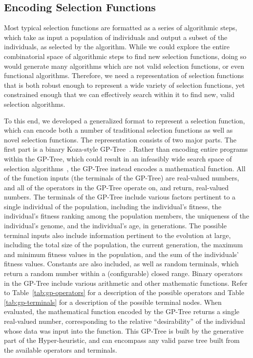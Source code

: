 \documentclass[times,12pt,titlepage]{mstogs}
\begin{document}
\begin{ThesisBody}
\section{Encoding Selection Functions}
\label{Methodology-Encoding Selection Functions}

Most typical selection functions are formatted as a series of algorithmic steps, which take as input a population of individuals and output a subset of the individuals, as selected by the algorithm. While we could explore the entire combinatorial space of algorithmic steps to find new selection functions, doing so would generate many algorithms which are not valid selection functions, or even functional algorithms. Therefore, we need a representation of selection functions that is both robust enough to represent a wide variety of selection functions, yet constrained enough that we can effectively search within it to find new, valid selection algorithms.

To this end, we developed a generalized format to represent a selection function, which can encode both a number of traditional selection functions as well as novel selection functions. The representation consists of two major parts. The first part is a binary Koza-style GP-Tree~\citep{koza1994genetic}. Rather than encoding entire programs within the GP-Tree, which could result in an infeasibly wide search space of selection algorithms~\citep{woodward2009GPNotGood}, the GP-Tree instead encodes a mathematical function. All of the function inputs (the terminals of the GP-Tree) are real-valued numbers, and all of the operators in the GP-Tree operate on, and return, real-valued numbers. The terminals of the GP-Tree include various factors pertinent to a single individual of the population, including the individual's fitness, the individual's fitness ranking among the population members, the uniqueness of the individual's genome, and the individual's age, in generations. The possible terminal inputs also include information pertinent to the evolution at large, including the total size of the population, the current generation, the maximum and minimum fitness values in the population, and the sum of the individuals' fitness values. Constants are also included, as well as random terminals, which return a random number within a (configurable) closed range. Binary operators in the GP-Tree include various arithmetic and other mathematic functions. Refer to Table~\ref{tab:gp-operators} for a description of the possible operators and Table \ref{tab:gp-terminals} for a description of the possible terminal nodes. When evaluated, the mathematical function encoded by the GP-Tree returns a single real-valued number, corresponding to the relative ``desirability'' of the individual whose data was input into the function. This GP-Tree is built by the generative part of the Hyper-heuristic, and can encompass any valid parse tree built from the available operators and terminals.


\end{ThesisBody}
\end{document}
